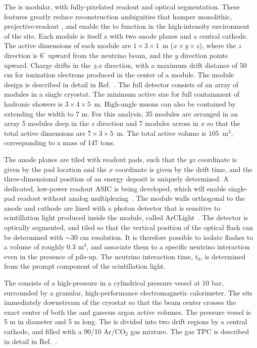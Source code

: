The  is modular, with fully-\threed  pixelated readout and optical segmentation. These features greatly reduce reconstruction ambiguities that hamper monolithic, projective-readout , and enable the  to function in the high-intensity environment of the   site. Each module is itself a   with two anode planes and a central cathode. The active dimensions of each module are $1 \times 3 \times 1$~m ($x \times y \times z$), where the $z$ direction is $6^{\circ}$ upward from the neutrino beam, and the $y$ direction points upward. Charge drifts in the $\pm x$ direction, with a maximum drift distance of 50 cm for ionization electrons produced in the center of a module. The module design is described in detail in Ref.~\cite{Asaadi:2018xfh}. The full  detector consists of an array of modules in a single cryostat. The minimum active size for full containment of hadronic showers is $3 \times 4 \times 5$~m. High-angle muons can also be contained by extending the width to 7 m. For this analysis, 35 modules are arranged in an array 5 modules deep in the $z$ direction and 7 modules across in $x$ so that the total active dimensions are $7 \times 3 \times 5$~m. The total active  volume is $105$~m$^{3}$, corresponding to a mass of 147 tons.

The anode planes are tiled with readout pads, such that the $yz$ coordinate is given by the pad location and the $x$ coordinate is given by the drift time, and the three-dimensional position of an energy deposit is uniquely determined. A dedicated, low-power readout ASIC is being developed, which will enable single-pad readout without analog multiplexing~\cite{Dwyer:2018phu}. The module walls orthogonal to the anode and cathode are lined with a photon detector that is sensitive to scintillation light produced inside the module, called ArCLight~\cite{Auger:2017flc}. The detector is optically segmented, and tiled so that the vertical position of the optical flash can be determined with $\sim$30 cm resolution. It is therefore possible to isolate flashes to a volume of roughly 0.3 m$^{3}$, and associate them to a specific neutrino interaction even in the presence of pile-up. The neutrino interaction time, $t_{0}$, is determined from the prompt component of the scintillation light.

The  consists of a high-pressure  in a cylindrical pressure vessel at 10 bar, surrounded by a granular, high-performance electromagnetic calorimeter. The  sits immediately downstream of the  cryostat so that the beam center crosses the exact center of both the  and gaseous argon active volumes. The pressure vessel is 5 m in diameter and 5 m long. The  is divided into two drift regions by a central cathode, and filled with a 90/10 Ar/CO$_{2}$ gas mixture. The gas TPC is described in detail in Ref.~\cite{bib:docdb12388}.

